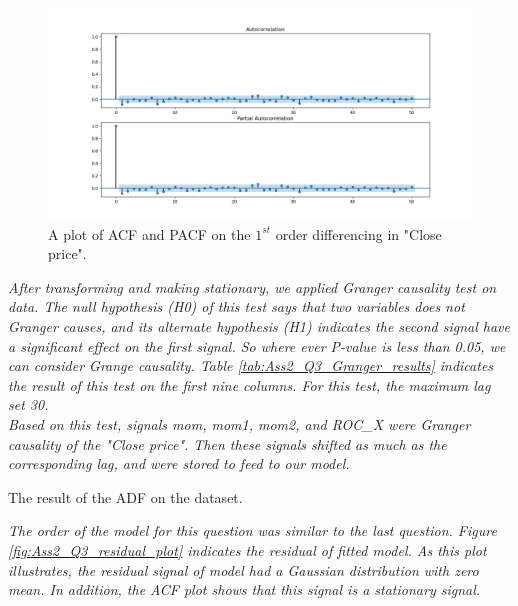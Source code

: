 \begin{figure}[H]
    \centering
    \begin{minipage}[b]{1\textwidth}
        \includegraphics[width=\textwidth]{figures/Ass2/Ass2_Q3_PACF_ACF_1diff.png}
    \end{minipage}
    \caption{A plot of \gls{ACF} and \gls{PACF} on the $1^{st}$ order differencing in "Close price".}
    \label{fig:Ass2_Q3_PACF_ACF_1diff}
\end{figure}

\textit{After transforming and making stationary, we applied 
Granger causality test on data. The null hypothesis (H0) of this test says that two variables does not Granger causes, and its alternate hypothesis (H1) indicates the second signal have a significant effect on the first signal. So where ever P-value is less than 0.05, we can consider Grange causality. Table \ref{tab:Ass2_Q3_Granger_results} indicates the result of this test on the first nine columns. For this test, the maximum lag set 30.\\
Based on this test, signals mom, mom1, mom2, and ROC\_X were Granger causality of the "Close price". Then these signals shifted as much as the corresponding lag, and were stored to feed to our model.}




\begin{table}[H]
\centering
\caption{The result of the \gls{ADF} on the dataset.}
\label{tab:Ass2_Q3_Granger_results}

\end{table}

\textit{The order of the model for this question was similar to the last question. Figure \ref{fig:Ass2_Q3_residual_plot} indicates the residual of fitted model. As this plot illustrates, the residual signal of model had a Gaussian distribution with zero mean. In addition, the \gls{ACF} plot shows that this signal is a stationary signal.}



